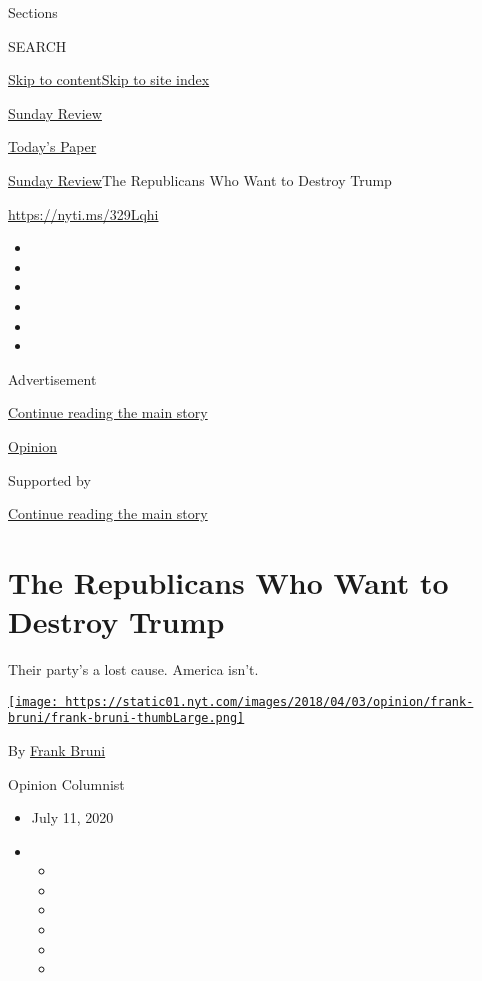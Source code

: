 Sections

SEARCH

\protect\hyperlink{site-content}{Skip to
content}\protect\hyperlink{site-index}{Skip to site index}

\href{https://www.nytimes.com/section/opinion/sunday}{Sunday Review}

\href{https://myaccount.nytimes.com/auth/login?response_type=cookie\&client_id=vi}{}

\href{https://www.nytimes.com/section/todayspaper}{Today's Paper}

\href{/section/opinion/sunday}{Sunday Review}\textbar{}The Republicans
Who Want to Destroy Trump

\href{https://nyti.ms/329Lqhi}{https://nyti.ms/329Lqhi}

\begin{itemize}
\item
\item
\item
\item
\item
\item
\end{itemize}

Advertisement

\protect\hyperlink{after-top}{Continue reading the main story}

\href{/section/opinion}{Opinion}

Supported by

\protect\hyperlink{after-sponsor}{Continue reading the main story}

\hypertarget{the-republicans-who-want-to-destroy-trump}{%
\section{The Republicans Who Want to Destroy
Trump}\label{the-republicans-who-want-to-destroy-trump}}

Their party's a lost cause. America isn't.

\href{https://www.nytimes.com/by/frank-bruni}{\texttt{[image: https://static01.nyt.com/images/2018/04/03/opinion/frank-bruni/frank-bruni-thumbLarge.png]}}

By \href{https://www.nytimes.com/by/frank-bruni}{Frank Bruni}

Opinion Columnist

\begin{itemize}
\item
  July 11, 2020
\item
  \begin{itemize}
  \item
  \item
  \item
  \item
  \item
  \item
  \end{itemize}
\end{itemize}

